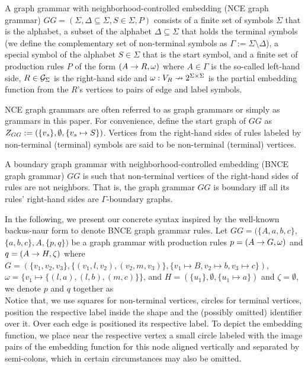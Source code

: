 \documentclass[runningheads]{llncs}
\begin{document}
\begin{definition}
	\label{def:gg}
	A graph grammar with neighborhood-controlled embedding (NCE graph grammar) $GG = (\Sigma, \Delta \subseteq \Sigma, S \in \Sigma, P)$ consists of a finite set of symbols $\Sigma$ that is the alphabet, a subset of the alphabet $\Delta \subseteq \Sigma$ that holds the terminal symbols (we define the complementary set of non-terminal symbols as $\Gamma := \Sigma \setminus \Delta$), a special symbol of the alphabet $S \in \Sigma$ that is the start symbol, and a finite set of production rules $P$ of the form $(A \to R, \omega)$ where $A \in \Gamma$ is the so-called left-hand side, $R \in \mathcal{G}_{\Sigma}$ is the right-hand side and $\omega : V_R \nrightarrow 2^{\Sigma \times \Sigma}$ is the partial embedding function from the $R$'s vertices to pairs of edge and label symbols.
\end{definition}

NCE graph grammars are often referred to as graph grammars or simply as grammars in this paper. For convenience, define the start graph of $GG$ as $Z_{GG} := (\{v_s\},\emptyset,\{v_s \mapsto S\})$. Vertices from the right-hand sides of rules labeled by non-terminal (terminal) symbols are said to be non-terminal (terminal) vertices.

\begin{definition}
	A boundary graph grammar with neighborhood-controlled embedding (BNCE graph grammar) $GG$ is such that non-terminal vertices of the right-hand sides of rules are not neighbors. That is, the graph grammar $GG$ is boundary iff all its rules' right-hand sides are $\Gamma\text{-boundary}$ graphs.
\end{definition}


In the following, we present our concrete syntax inspired by the well-known backus-naur form to denote BNCE graph grammar rules. Let $GG = (\{A,a,b,c\},$ $\{a,b,c\}, A, \{p,q\})$ be a graph grammar with production rules $p = (A \to G,\omega)$ and $q = (A \to H,\zeta)$ where $G = (\{v_1, v_2, v_3\}, \{(v_1,l,v_2), (v_2,m,v_3)\}, \{v_1 \mapsto B, v_2 \mapsto b, v_3 \mapsto c \})$, $\omega = \{v_1 \mapsto \{(l,a), (l,b), (m,c)\}\}$, and $H = (\{u_1\}, \emptyset, \{u_1 \mapsto a\})$ and $\zeta = \emptyset$, we denote $p$ and $q$ together as\\


Notice that, we use squares for non-terminal vertices, circles for terminal vertices, position the respective label inside the shape and the (possibly omitted) identifier over it. Over each edge is positioned its respective label. To depict the embedding function, we place near the respective vertex a small circle labeled with the image pairs of the embedding function for this node aligned vertically and separated by semi-colons, which in certain circumstances may also be omitted.
\end{document}
